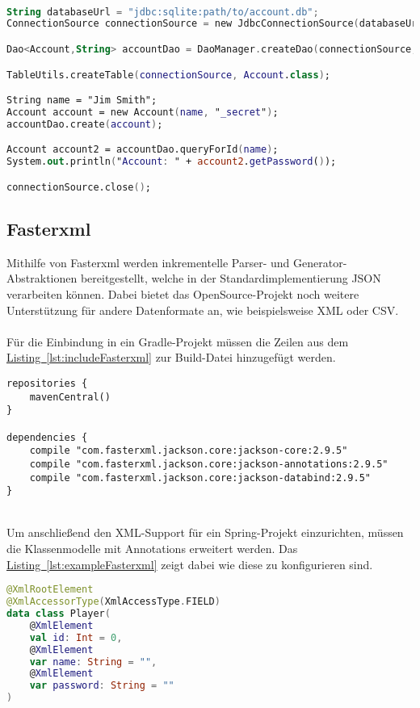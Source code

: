 \\
\begin{lstlisting}[style=lstStyleFramed, language=Kotlin, caption={Beispiel: Verwendung von ORMLite (verändert nach \cite{ormlite})}, label=lst:ormliteUsageExample, float]
String databaseUrl = "jdbc:sqlite:path/to/account.db";
ConnectionSource connectionSource = new JdbcConnectionSource(databaseUrl);

Dao<Account,String> accountDao = DaoManager.createDao(connectionSource, Account.class);

TableUtils.createTable(connectionSource, Account.class);

String name = "Jim Smith";
Account account = new Account(name, "_secret");
accountDao.create(account);

Account account2 = accountDao.queryForId(name);
System.out.println("Account: " + account2.getPassword());

connectionSource.close();
\end{lstlisting}

\subsection{Fasterxml}\label{sec:bibfasterxml}
Mithilfe von Fasterxml werden inkrementelle Parser- und Generator-Abstraktionen bereitgestellt, welche in der Standardimplementierung \gls{JSON} verarbeiten können. Dabei bietet das OpenSource-Projekt noch weitere Unterstützung für andere Datenformate an, wie beispielsweise \gls{XML} oder \gls{CSV}.\cite{fasterxml}\\
\\
Für die Einbindung in ein Gradle-Projekt müssen die Zeilen aus dem \hyperref[lst:includeFasterxml]{Listing~\ref{lst:includeFasterxml}} zur Build-Datei hinzugefügt werden.
\\
\begin{lstlisting}[style=lstStyleFramed, language=Gradle, caption={Einbindung der Bibliothek Fasterxml mittels Gradle}, label=lst:includeFasterxml, float]
repositories {
	mavenCentral()
}

dependencies {
	compile "com.fasterxml.jackson.core:jackson-core:2.9.5"
	compile "com.fasterxml.jackson.core:jackson-annotations:2.9.5"
	compile "com.fasterxml.jackson.core:jackson-databind:2.9.5"
}
\end{lstlisting}
\\
Um anschließend den \gls{XML}-Support für ein Spring-Projekt einzurichten, müssen die Klassenmodelle mit Annotations erweitert werden. Das \hyperref[lst:exampleFasterxml]{Listing~\ref{lst:exampleFasterxml}} zeigt dabei wie diese zu konfigurieren sind.
\\
\begin{lstlisting}[style=lstStyleFramed, language=Kotlin, caption={Beispiel: Verwendung von Fasterxml}, label=lst:exampleFasterxml, float]
@XmlRootElement
@XmlAccessorType(XmlAccessType.FIELD)
data class Player(
	@XmlElement
	val id: Int = 0,
	@XmlElement
	var name: String = "",
	@XmlElement
	var password: String = ""
)
\end{lstlisting} 

